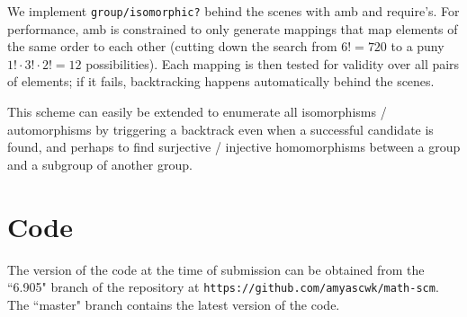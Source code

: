 \documentclass{article}
\begin{document}
            We implement \texttt{group/isomorphic?} behind the scenes with amb and require's. For performance, amb is constrained to only generate mappings that map elements of the same order to each other (cutting down the search from $6! = 720$ to a puny $1! \cdot 3! \cdot 2! = 12$ possibilities). Each mapping is then tested for validity over all pairs of elements; if it fails, backtracking happens automatically behind the scenes.
		
            This scheme can easily be extended to enumerate all isomorphisms / automorphisms by triggering a backtrack even when a successful candidate is found, and perhaps to find surjective / injective homomorphisms between a group and a subgroup of another group.    
    
    \section{Code}
        
        The version of the code at the time of submission can be obtained from the ``6.905" branch of the repository at \texttt{https://github.com/amyascwk/math-scm}. The ``master" branch contains the latest version of the code.
        
    
    
\end{document}

